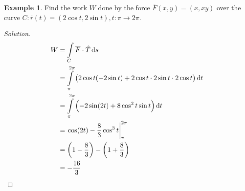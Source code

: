 \documentclass[fleqn, a4paper, 12pt]{article}
\theoremstyle{definition}
\newtheorem{example}{Example}
\theoremstyle{theorem}
\theoremstyle{remark}
\newenvironment{solution}
{\begin{proof}[Solution]\let\qed\relax}
	{\end{proof}}
\begin{document}
\begin{example}
	Find the work $W$ done by the force $\overline{F}(x,y) = (x, xy)$ over the curve $C : \overline{r}(t) = (2 \cos t, 2 \sin t) , t : \pi \to 2 \pi$.
\end{example}

\begin{solution}
	\begin{align*}
		W &= \int\limits_{C} \overline{F} \cdot \hat{T} \dif s\\
		&= \int\limits_{\pi}^{2 \pi} \left( 2 \cos t (-2 \sin t) + 2 \cos t \cdot 2 \sin t \cdot 2 \cos t \right) \dif t\\
		&= \int\limits_{\pi}^{2 \pi} \left( - 2 \sin (2t) + 8 \cos^2 t \sin t \right) \dif t\\
		&= \left. \cos (2t) - \dfrac{8}{3} \cos^3 t \right\rvert_{\pi}^{2 \pi}\\
		&= \left( 1 - \dfrac{8}{3} \right) - \left( 1 + \dfrac{8}{3} \right)\\
		&= -\dfrac{16}{3}
	\end{align*}
\end{solution}
\end{document}
